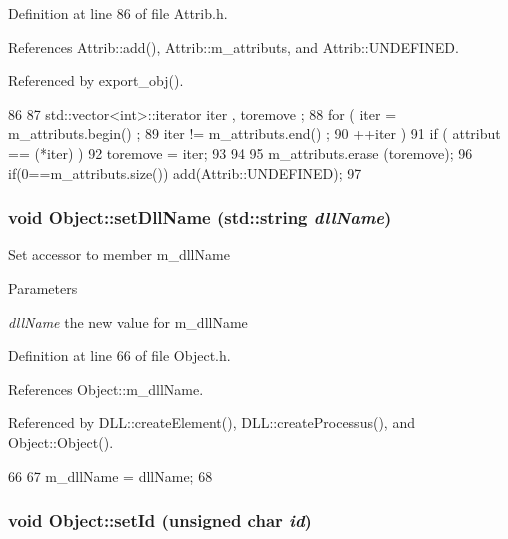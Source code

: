 Definition at line 86 of file Attrib.h.

References Attrib::add(), Attrib::m\_\-attributs, and Attrib::UNDEFINED.

Referenced by export\_\-obj().


\begin{DoxyCode}
86                                {
87     std::vector<int>::iterator iter , toremove ;
88     for ( iter  = m_attributs.begin() ;
89           iter != m_attributs.end()   ;
90           ++iter ) {
91       if ( attribut == (*iter) ) {
92         toremove = iter;
93       }
94     }
95     m_attributs.erase (toremove);
96     if(0==m_attributs.size()) add(Attrib::UNDEFINED);
97   }
\end{DoxyCode}
\hypertarget{classObject_a870c5af919958c2136623b2d7816d123}{
\subsubsection[{setDllName}]{\setlength{\rightskip}{0pt plus 5cm}void Object::setDllName (std::string {\em dllName})}}
\label{classObject_a870c5af919958c2136623b2d7816d123}
Set accessor to member m\_\-dllName 
\begin{DoxyParams}{Parameters}
\item[{\em dllName}]the new value for m\_\-dllName \end{DoxyParams}


Definition at line 66 of file Object.h.

References Object::m\_\-dllName.

Referenced by DLL::createElement(), DLL::createProcessus(), and Object::Object().


\begin{DoxyCode}
66                                       {
67     m_dllName = dllName;
68   }
\end{DoxyCode}
\hypertarget{classObject_a398fe08cba594a0ce6891d59fe4f159f}{
\subsubsection[{setId}]{\setlength{\rightskip}{0pt plus 5cm}void Object::setId (unsigned char {\em id})}}
\label{classObject_a398fe08cba594a0ce6891d59fe4f159f}


